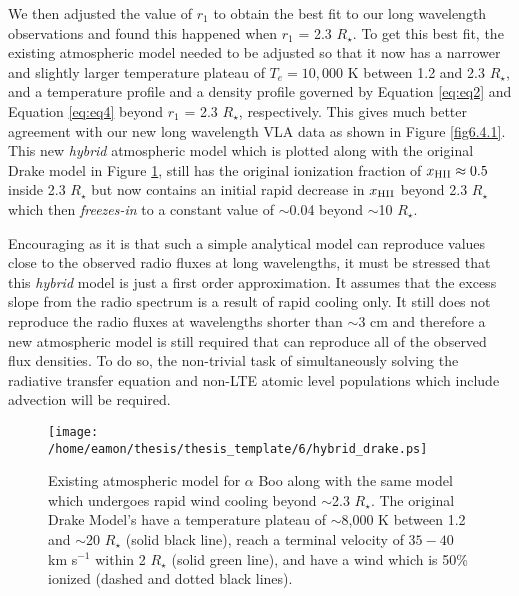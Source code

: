 We then adjusted the value of $r_{1}$ to obtain the best fit to our long wavelength observations and found this happened when $r_{1}$ = 2.3 $R_{\star}$. To get this best fit, the existing atmospheric model needed to be adjusted so that it now has a narrower and slightly larger temperature plateau of $T_e = 10,000$ K between 1.2 and 2.3 $R_{\star}$, and a temperature profile and a density profile governed by Equation \ref{eq:eq2} and Equation \ref{eq:eq4} beyond $r_{1}$ = 2.3 $R_{\star}$, respectively. This gives much better agreement with our new long wavelength VLA data as shown in Figure \ref{fig6.4.1}. This new \textit{hybrid} atmospheric model which is plotted along with the original Drake model in Figure \ref{fig6.9.3}, still has the original ionization fraction of $x_{\rm{HII}} \approx 0.5$ inside 2.3 $R_{\star}$ but now contains an initial rapid decrease in $x_{\rm{HII}}$ beyond 2.3 $R_{\star}$ which then \textit{freezes-in} to a constant value of $\sim$0.04 beyond $\sim$10 $R_{\star}$.

Encouraging as it is that such a simple analytical model can reproduce values close to the observed radio fluxes at long wavelengths, it must be stressed that this \textit{hybrid} model is just a first order approximation. It assumes that the excess slope from the radio spectrum is a result of rapid cooling only. It still does not reproduce the radio fluxes at wavelengths shorter than $\sim 3$ cm and therefore a new atmospheric model is still required that can reproduce all of the observed flux densities. To do so, the non-trivial task of simultaneously solving the radiative transfer equation and non-LTE atomic level populations which include advection will be required.

\begin{figure}[hbt!]
\centering 
          \texttt{[image: /home/eamon/thesis/thesis\_template/6/hybrid\_drake.ps]}
\caption[Hybrid Drake model which undergoes rapid wind cooling beyond $\sim$2.3 $R_{\star}$.]{Existing atmospheric model for $\alpha$ Boo \cite[`model A']{drake_1985} along with the same model which undergoes rapid wind cooling beyond $\sim$2.3 $R_{\star}$. The original Drake Model's have a temperature plateau of $\sim$8,000 K between 1.2 and $\sim$20 $R_{\star}$ (solid black line), reach a terminal velocity of $35-40$ km s$^{-1}$ within 2 $R_{\star}$ (solid green line), and have a wind which is 50\% ionized (dashed and dotted black lines).}
\label{fig6.9.3}
\end{figure}

